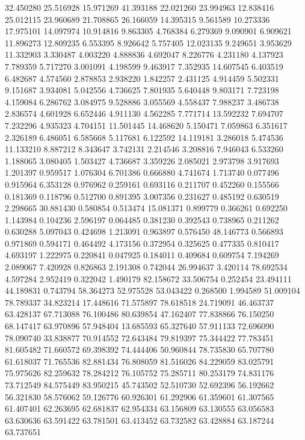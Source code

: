 32.450280
25.516928
15.971269
41.393188
22.021260
23.994963
12.838416
25.012115
23.960689
21.708865
26.166059
14.395315
9.561589
10.273336
17.975101
14.097974
10.914816
9.863305
4.768384
6.279369
9.090901
6.909621
11.896273
12.809235
6.553395
8.926642
5.757405
12.023135
9.249651
3.953629
11.332903
3.330487
4.003220
4.888836
4.692047
8.226776
4.231180
4.137923
7.789359
5.717270
3.001091
4.198599
9.463917
7.352935
14.607545
6.403519
6.482687
4.574560
2.878853
2.938220
1.842257
2.431125
4.914459
5.502331
9.151687
3.934081
5.042556
4.736625
7.801935
5.640448
9.803171
7.723198
4.159084
6.286762
3.084975
9.528886
3.055569
4.558437
7.988237
3.486738
2.836574
4.601928
6.652446
4.911130
4.562285
7.771714
13.592232
7.694707
7.232296
4.935323
4.704151
11.501445
14.468620
5.150471
7.059863
6.351617
2.326189
6.486051
6.585668
5.117681
6.122592
14.119181
3.286018
5.474536
11.133210
8.887212
8.343647
3.742131
2.214546
3.208816
7.946043
6.533260
1.188065
3.080405
1.503427
4.736687
3.359226
2.085021
2.973798
3.917693
1.201397
0.959517
1.076304
6.701386
0.666880
4.741674
1.713740
0.077496
0.915964
6.353128
0.976962
0.259161
0.693116
0.211707
0.452260
0.155566
0.181369
0.118796
0.512700
0.891395
3.007356
0.231627
0.485192
0.630519
2.298665
30.881430
0.580854
0.513474
15.081371
0.899779
0.366261
0.692250
1.143984
0.104236
2.596197
0.064485
0.381230
0.392543
0.738965
0.211262
0.630288
5.097043
0.424698
1.213091
0.963897
0.576450
48.146773
0.566893
0.971869
0.594171
0.464492
4.173156
0.372954
0.325625
0.477335
0.810417
4.693197
1.222975
0.220841
0.047925
0.184011
0.409684
0.609754
7.194269
2.089067
7.420928
0.826863
2.191308
0.742044
26.994637
3.420114
78.692534
4.597284
2.952419
0.322042
1.490179
82.158672
33.506754
0.252454
23.494111
44.189831
0.743794
58.364273
52.975528
53.043422
0.268500
1.994589
51.009104
78.789337
34.823214
17.448616
71.575897
78.618518
24.719091
46.463737
63.428137
67.713088
76.100486
80.639854
47.162407
77.838866
76.150250
68.147417
63.970896
57.948404
13.685593
65.327640
57.911133
72.696090
78.090740
33.838877
70.914552
72.643484
79.819397
75.344422
77.783451
81.605482
71.660572
69.398392
74.444406
50.960844
78.735830
65.707780
61.618037
71.765536
82.881434
76.808059
81.516026
84.229059
83.025791
75.975626
82.259632
78.284212
76.105752
75.285711
80.253179
74.831176
73.712549
84.575449
83.950215
45.743502
52.510730
52.692396
56.192662
56.321830
58.576062
59.126776
60.926301
61.292906
61.359601
61.307565
61.407401
62.263695
62.681837
62.954334
63.156809
63.130555
63.056583
63.630636
63.591422
63.781501
63.413452
63.732582
63.428884
63.187244
63.737651
